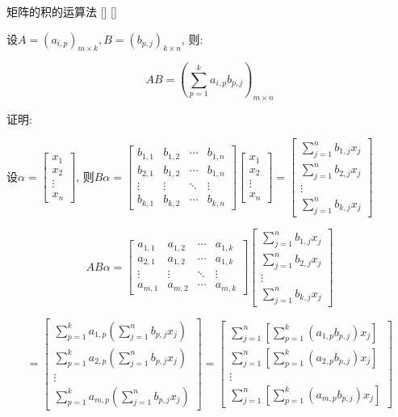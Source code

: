 \documentclass[UTF8]{ctexart}
\begin{document}
		\begin{thm}
			[]
			{矩阵的积的运算法}
			[]
			[]

			设$A=(a_{i,p})_{m\times k}, B=(b_{p,j})_{k\times n}$, 则:
			
			$$AB=(\sum_{p=1}^{k}a_{i,p}b_{p,j})_{m\times n}$$
		\end{thm}
		\begin{prf}
		证明: 
			
			设$\alpha=\begin{bmatrix}x_1\\x_2\\\vdots\\x_n\end{bmatrix}$, 则$B\alpha=
			\begin{bmatrix}
				b_{1,1}&b_{1,2}&\cdots&b_{1,n}\\
				b_{2,1}&b_{1,2}&\cdots&b_{1,n}\\
				\vdots&\vdots&\ddots&\vdots\\
				b_{k,1}&b_{k,2}&\cdots&b_{k,n}
			\end{bmatrix}
			\begin{bmatrix}
			x_1\\x_2\\\vdots\\x_n
			\end{bmatrix}=
			\begin{bmatrix}
			\sum_{j=1}^{n}b_{1,j}x_j\\\sum_{j=1}^{n}b_{2,j}x_j\\\vdots\\\sum_{j=1}^{n}b_{k,j}x_j
			\end{bmatrix}$
			
			$$AB\alpha=
			\begin{bmatrix}
				a_{1,1}&a_{1,2}&\cdots&a_{1,k}\\
				a_{2,1}&a_{1,2}&\cdots&a_{1,k}\\
				\vdots&\vdots&\ddots&\vdots\\
				a_{m,1}&a_{m,2}&\cdots&a_{m,k}
			\end{bmatrix}
			\begin{bmatrix}
			\sum_{j=1}^{n}b_{1,j}x_j\\\sum_{j=1}^{n}b_{2,j}x_j\\\vdots\\\sum_{j=1}^{n}b_{k,j}x_j
			\end{bmatrix}$$
			
			$$
			=\begin{bmatrix}
			\sum_{p=1}^{k}a_{1,p}(\sum_{j=1}^{n}b_{p,j}x_j)\\
			\sum_{p=1}^{k}a_{2,p}(\sum_{j=1}^{n}b_{p,j}x_j)\\
			\vdots\\
			\sum_{p=1}^{k}a_{m,p}(\sum_{j=1}^{n}b_{p,j}x_j)
			\end{bmatrix}
			=\begin{bmatrix}
			\sum_{j=1}^{n}[\sum_{p=1}^{k}(a_{1,p}b_{p,j})x_j]\\
			\sum_{j=1}^{n}[\sum_{p=1}^{k}(a_{2,p}b_{p,j})x_j]\\
			\vdots\\
			\sum_{j=1}^{n}[\sum_{p=1}^{k}(a_{m,p}b_{p,j})x_j]
			\end{bmatrix}$$
			

\end{prf}
\end{document}
